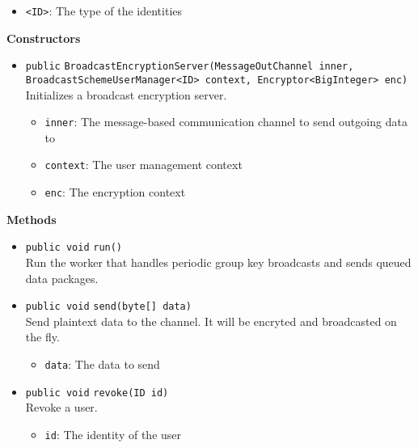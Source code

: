 \begin{itemize}
\item \lstinline|<ID>|: The type of the identities
\end{itemize}


\textbf{Constructors}
\begin{itemize}
\item \lstinline|public| \lstinline|BroadcastEncryptionServer|\lstinline|(MessageOutChannel inner, BroadcastSchemeUserManager<ID> context, Encryptor<BigInteger> enc)|\\
Initializes a broadcast encryption server.
\begin{itemize}
\item \lstinline|inner|: The message-based communication channel to send outgoing data to
\item \lstinline|context|: The user management context
\item \lstinline|enc|: The encryption context
\end{itemize}



\end{itemize}


\textbf{Methods}
\begin{itemize}
\item \lstinline|public void| \lstinline|run|\lstinline|()|\\
Run the worker that handles periodic group key broadcasts and sends
 queued data packages.



\item \lstinline|public void| \lstinline|send|\lstinline|(byte[] data)|\\
Send plaintext data to the channel. It will be encryted and broadcasted
 on the fly.
\begin{itemize}
\item \lstinline|data|: The data to send
\end{itemize}



\item \lstinline|public void| \lstinline|revoke|\lstinline|(ID id)|\\
Revoke a user.
\begin{itemize}
\item \lstinline|id|: The identity of the user
\end{itemize}



\end{itemize}

